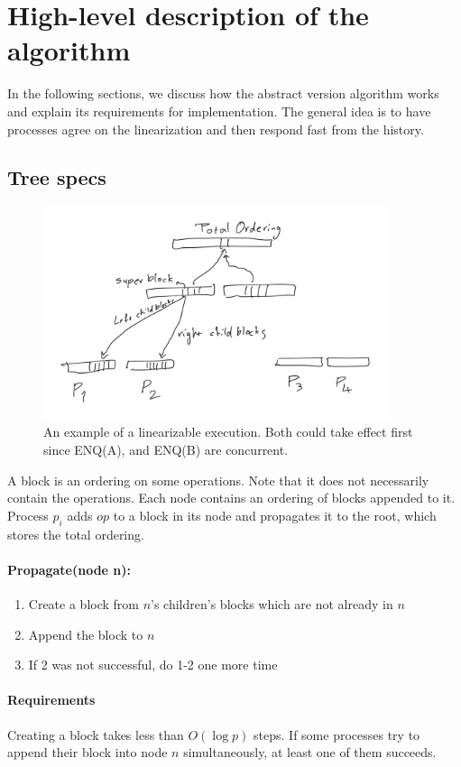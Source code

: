 \documentclass[12pt]{article}
\begin{document}
\section*{High-level description of the algorithm}

In the following sections, we discuss how the abstract version algorithm works and explain its requirements for implementation. The general idea is to have processes agree on the linearization and then respond fast from the history.

\subsection*{Tree specs}
\begin{figure}[hbt]
  \center\includegraphics[width=4in]{pics/tree}
  \caption{An example of a linearizable execution. Both could take effect first since ENQ(A), and ENQ(B) are concurrent.}
\end{figure}
A block is an ordering on some operations. Note that it does not necessarily contain the operations. Each node contains an ordering of blocks appended to it. Process $p_i$ adds $op$ to a block in its node and propagates it to the root, which stores the total ordering.

\paragraph{Propagate(node n):}
\begin{enumerate}
  \item Create a block from $n$'s children's blocks which are not already in $n$
  \item Append the block to $n$
  \item If 2 was not successful, do 1-2 one more time
\end{enumerate}

\paragraph{Requirements}
Creating a block takes less than $O(\log p)$ steps. If some processes try to append their block into node $n$ simultaneously, at least one of them succeeds.
\end{document}
